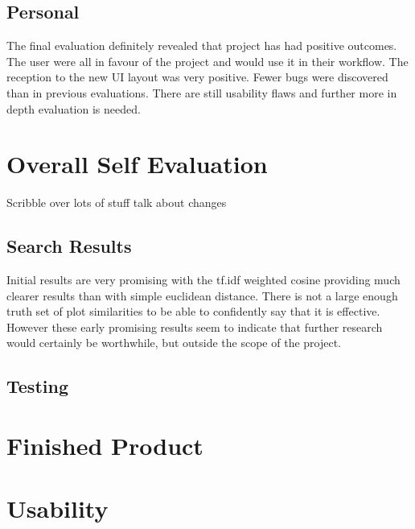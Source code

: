 \subsection{Personal}

The final evaluation definitely revealed that project has had positive outcomes.  The user were all in favour of the project and would use it in their workflow.  The reception to the new \ac{UI} layout was very positive.  Fewer bugs were discovered than in previous evaluations.  There are still usability flaws and further more in depth evaluation is needed.

\section{Overall Self Evaluation}
Scribble over lots of stuff talk about changes




\subsection{Search Results}
Initial results are very promising with the tf.idf weighted cosine providing much clearer results than with simple euclidean distance.  There is not a large enough truth set of plot similarities to be able to confidently say that it is effective.  However these early promising results seem to indicate that further research would certainly be worthwhile, but outside the scope of the project.

\subsection{Testing}

\section{Finished Product}

\section{Usability}

